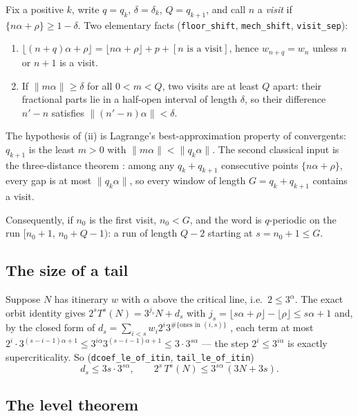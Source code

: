 \documentclass[11pt]{article}
\theoremstyle{definition}
\newcommand{\code}[1]{\texttt{#1}}
\begin{document}
Fix a positive $k$, write $q = q_k$, $\delta = \delta_k$, $Q =
q_{k+1}$, and call $n$ a \emph{visit} if $\{n\alpha + \rho\} \ge 1 -
\delta$. Two elementary facts (\code{floor\_shift}, \code{mech\_shift},
\code{visit\_sep}):
\begin{enumerate}
\item[(i)] $\lfloor (n+q)\alpha + \rho \rfloor = \lfloor n\alpha +
\rho\rfloor + p + [n \text{ is a visit}]$, hence $w_{n+q} = w_n$
unless $n$ or $n+1$ is a visit.
\item[(ii)] If $\|m\alpha\| \ge \delta$ for all $0 < m < Q$, two
visits are at least $Q$ apart: their fractional parts lie in a
half-open interval of length $\delta$, so their difference $n' - n$
satisfies $\|(n'-n)\alpha\| < \delta$.
\end{enumerate}
The hypothesis of (ii) is Lagrange's best-approximation property of
convergents: $q_{k+1}$ is the least $m > 0$ with $\|m\alpha\| <
\|q_k\alpha\|$. The second classical input is the three-distance
theorem \cite{sos}: among any $q_k + q_{k+1}$ consecutive points
$\{n\alpha + \rho\}$, every gap is at most $\|q_k\alpha\|$, so every
window of length $G = q_k + q_{k+1}$ contains a visit.

Consequently, if $n_0$ is the first visit, $n_0 < G$, and the word is
$q$-periodic on the run $[n_0 + 1,\, n_0 + Q - 1)$: a run of length
$Q - 2$ starting at $s = n_0 + 1 \le G$.

\subsection{The size of a tail}

Suppose $N$ has itinerary $w$ with $\alpha$ above the critical line,
i.e.\ $2 \le 3^\alpha$. The exact orbit identity gives $2^s T^s(N) =
3^{j_s} N + d_s$ with $j_s = \lfloor s\alpha + \rho\rfloor - \lfloor
\rho\rfloor \le s\alpha + 1$ and, by the closed form of
$d_s = \sum_{i<s} w_i 2^i 3^{\#\{\text{ones in } (i, s)\}}$
\cite{ladder}, each term at most $2^i \cdot 3^{(s-i-1)\alpha + 1} \le
3^{i\alpha} 3^{(s-i-1)\alpha+1} \le 3 \cdot 3^{s\alpha}$ --- the step
$2^i \le 3^{i\alpha}$ is exactly supercriticality. So
(\code{dcoef\_le\_of\_itin}, \code{tail\_le\_of\_itin})
\[
d_s \le 3s\cdot 3^{s\alpha}, \qquad
2^s\, T^s(N) \le 3^{s\alpha}\,(3N + 3s).
\]

\subsection{The level theorem}
\end{document}

